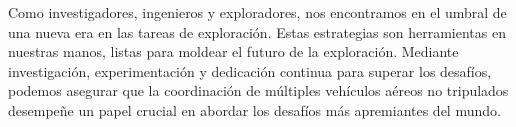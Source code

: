 \documentclass[sigconf]{acmart}
\begin{document}
Como investigadores, ingenieros y exploradores, nos encontramos en el umbral de una nueva era en las tareas de exploración. Estas estrategias son herramientas en nuestras manos, listas para moldear el futuro de la exploración. Mediante investigación, experimentación y dedicación continua para superar los desafíos, podemos asegurar que la coordinación de múltiples vehículos aéreos no tripulados desempeñe un papel crucial en abordar los desafíos más apremiantes del mundo.\\







\end{document}
